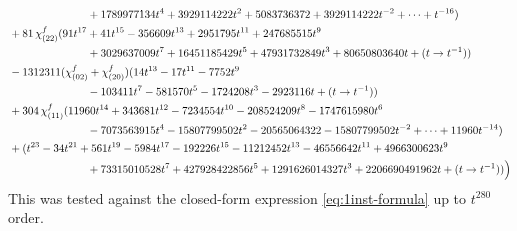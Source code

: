 \documentclass[letterpaper, 11pt]{article}
\newcommand{\nn}{\nonumber}
\begin{document}
{\begin{align}
    &\hspace{2.5cm}+1789977134 t^4+3929114222 t^2+5083736372+3929114222 t^{-2}+\cdots+t^{-16})\nn\\
    &+81\,\chi^f_{(22)}(91 t^{17}+41 t^{15}-356609 t^{13}+2951795 t^{11}+247685515 t^9\nn\\
    &\hspace{2.5cm}+3029637009 t^7+16451185429 t^5+47931732849 t^3+80650803640 t+(t\rightarrow t^{-1}))\nn\\
    &-1312311(\chi^f_{(02)}+\chi^f_{(20)})(14 t^{13}-17 t^{11}-7752 t^9\nn\\
    &\hspace{2.5cm}-103411 t^7-581570 t^5-1724208 t^3-2923116 t+(t\rightarrow t^{-1}))\nn\\
    &+304\,\chi^f_{(11)}(11960 t^{14}+343681 t^{12}-7234554 t^{10}-208524209 t^8-1747615980 t^6\nn\\
    &\hspace{2.5cm}-7073563915 t^4-15807799502 t^2-20565064322-15807799502 t^{-2}+\cdots+11960t^{-14})\nn\\
    &+(t^{23}-34 t^{21}+561 t^{19}-5984 t^{17}-192226 t^{15}-11212452 t^{13}-46556642 t^{11}+4966300623 t^9\nn\\
    &\hspace{2.5cm}+73315010528 t^7+427928422856 t^5+1291626014327 t^3+2206690491962 t+(t\rightarrow t^{-1}))\Big) \nn
\end{align}
This was tested against the closed-form expression \eqref{eq:1inst-formula} up to $t^{280}$ order.

}
\end{document}
